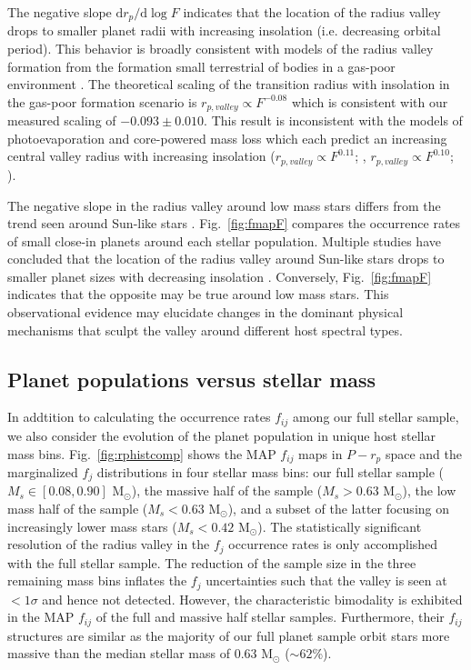 \documentclass[twocolumn]{emulateapj}
\begin{document}
The negative slope $\text{d}r_p / \text{d}\log{F}$ indicates that the location of the radius valley
drops to smaller planet radii with increasing insolation (i.e. decreasing orbital period). This behavior
is broadly consistent with models of the radius valley formation from the formation small terrestrial of
bodies in a gas-poor environment \citep{lee14,lee16,lopez18}. The theoretical scaling of the transition
radius with insolation in the gas-poor formation scenario is $r_{p,valley} \propto F^{-0.08}$
\citep{lopez18} which is
consistent with our measured scaling of $-0.093\pm 0.010$. This result is inconsistent with the
models of photoevaporation and core-powered mass loss which each predict an increasing central valley
radius with increasing insolation ($r_{p,valley} \propto F^{0.11}$; \citealt{lopez18},  
$r_{p,valley} \propto F^{0.10}$; \citealt{gupta19b}).

The negative slope in the radius valley around low mass stars differs from the trend seen around
Sun-like stars \citep{fulton17}. Fig.~\ref{fig:fmapF} compares the occurrence rates of small close-in
planets around each stellar population. Multiple studies have concluded that the location of the
radius valley around Sun-like stars drops to smaller planet sizes with decreasing insolation
\citep[e.g.][]{vaneylen18,martinez19}. Conversely, Fig.~\ref{fig:fmapF} indicates that the opposite
may be true around low mass stars. This observational evidence may elucidate changes in the dominant
physical mechanisms that sculpt the valley around different host spectral types.


\subsection{Planet populations versus stellar mass} \label{sect:Msbin}
In addtition to calculating the occurrence rates $f_{ij}$ among our full stellar sample, we also consider
the evolution of the planet population in unique host stellar mass bins. Fig.~\ref{fig:rphistcomp} shows
the MAP $f_{ij}$ maps in $P-r_p$ space and the marginalized $f_j$ distributions in four stellar mass bins:
our full stellar sample
($M_s \in [0.08,0.90]$ M$_{\odot}$), the massive half of the sample ($M_s>0.63$ M$_{\odot}$),  
the low mass half of the sample ($M_s<0.63$ M$_{\odot}$), and a subset of the latter focusing on
increasingly lower mass stars ($M_s<0.42$ M$_{\odot}$). The statistically significant resolution of the
radius valley in the $f_j$ occurrence rates is only accomplished with the full stellar sample. The reduction
of the sample size in the three remaining mass bins inflates the $f_j$ uncertainties such that the valley
is seen at $<1\sigma$ and hence not detected. However, the characteristic bimodality is exhibited in the
MAP $f_{ij}$ of the full and massive half stellar samples. Furthermore, their $f_{ij}$ structures are similar
as the majority of our full planet sample orbit stars more massive than the median stellar mass of 0.63
M$_{\odot}$ ($\sim 62$\%).
\end{document}
